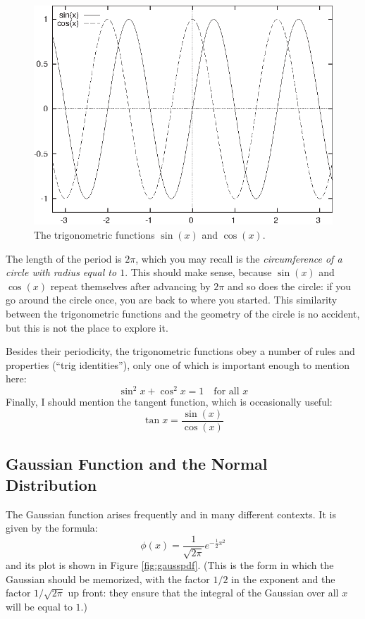 \begin{figure}
  \centerline{\includegraphics{img/trig}}
  \caption{The trigonometric functions $\sin(x)$ and $\cos(x)$.}
  \label{fig:trigonometrics}
\end{figure}

The length of the period is $2\pi$, which you may recall is the
\emph{circumference of a circle with radius equal to $1$}. This should
make sense, because $\sin(x)$ and $\cos(x)$ repeat themselves after
advancing by $2\pi$ and so does  the circle: if you go around the
circle once, you are back to where you started. This similarity
between the trigonometric functions and the geometry of the circle is
no accident, but this is not the place to explore it.

Besides their periodicity, the trigonometric functions obey a number
of rules and properties (``trig identities''), only one of which 
is important enough to mention here:
%
\[
\sin^2 x + \cos^2 x = 1 \quad \text{for all $x$}
\]
%
Finally, I should mention the tangent function, which is occasionally
useful:
%
\[
\tan x = \frac{\sin(x)}{\cos(x)}
\]
%    

\subsection{Gaussian Function and the Normal Distribution}


The Gaussian function arises frequently and in many different
contexts. It is given by the formula:
%
\[
\phi(x) = \frac{1}{\sqrt{2 \pi}} e^{-\frac{1}{2}x^2}
\]
%
and its plot is shown in Figure \ref{fig:gausspdf}. (This is the form
in which the Gaussian should be memorized, with the factor $1/2$ in
the exponent and the factor $1/\sqrt{2\pi}$ up front: they ensure that
the integral of the Gaussian over all $x$ will be equal to $1$.)

